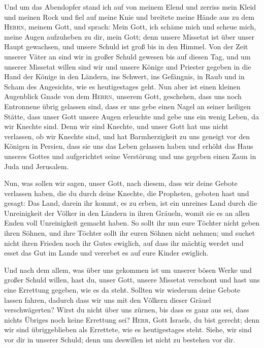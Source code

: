  Und um das Abendopfer stand ich auf von meinem Elend und
zerriss mein Kleid und meinen Rock und fiel auf meine Knie und breitete
meine Hände aus zu dem \textsc{Herrn}, meinem Gott,  und
sprach: Mein Gott, ich schäme mich und scheue mich, meine Augen
aufzuheben zu dir, mein Gott; denn unsere Missetat ist über unser Haupt
gewachsen, und unsere Schuld ist groß bis in den Himmel. 
Von der Zeit unserer Väter an sind wir in großer Schuld gewesen bis auf
diesen Tag, und um unserer Missetat willen sind wir und unsere Könige
und Priester gegeben in die Hand der Könige in den Ländern, ins Schwert,
ins Gefängnis, in Raub und in Scham des Angesichts, wie es heutigestages
geht.  Nun aber ist einen kleinen Augenblick Gnade von dem
\textsc{Herrn}, unserem Gott, geschehen, dass uns noch Entronnene übrig
gelassen sind, dass er uns gebe einen Nagel an seiner heiligen Stätte,
dass unser Gott unsere Augen erleuchte und gebe uns ein wenig Leben, da
wir Knechte sind.  Denn wir sind Knechte, und unser Gott
hat uns nicht verlassen, ob wir Knechte sind, und hat Barmherzigkeit zu
uns geneigt vor den Königen in Persien, dass sie uns das Leben gelassen
haben und erhöht das Haus unseres Gottes und aufgerichtet seine
Verstörung und uns gegeben einen Zaun in Juda und Jerusalem.

 Nun, was sollen wir sagen, unser Gott, nach diesem, dass
wir deine Gebote verlassen haben,  die du durch deine
Knechte, die Propheten, geboten hast und gesagt: Das Land, darein ihr
kommt, es zu erben, ist ein unreines Land durch die Unreinigkeit der
Völker in den Ländern in ihren Gräueln, womit sie es an allen Enden voll
Unreinigkeit gemacht haben.  So sollt ihr nun eure
Töchter nicht geben ihren Söhnen, und ihre Töchter sollt ihr euren
Söhnen nicht nehmen; und suchet nicht ihren Frieden noch ihr Gutes
ewiglich, auf dass ihr mächtig werdet und esset das Gut im Lande und
vererbet es auf eure Kinder ewiglich.

 Und nach dem allem, was über uns gekommen ist um unserer
bösen Werke und großer Schuld willen, hast du, unser Gott, unsere
Missetat verschont und hast uns eine Errettung gegeben, wie es da steht.
 Sollten wir wiederum deine Gebote lassen fahren, dadurch
dass wir uns mit den Völkern dieser Gräuel verschwägerten? Wirst du
nicht über uns zürnen, bis dass es ganz aus sei, dass nichts Übriges
noch keine Errettung sei?  \textsc{Herr}, Gott Israels,
du bist gerecht; denn wir sind übriggeblieben als Errettete, wie es
heutigestages steht. Siehe, wir sind vor dir in unserer Schuld; denn um
deswillen ist nicht zu bestehen vor dir.

